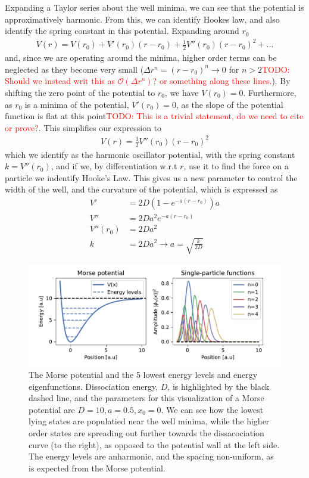 \documentclass{subfiles}
\begin{document}
Expanding a Taylor series about the well minima, we can see that the potential is approximatively harmonic. From this, we can identify Hookes law, and also identify the spring constant in this potential. Expanding around $r_0$
\begin{align*}
    V(r) = V(r_0) + V'(r_0)(r-r_0) + \frac{1}{2}V''(r_0)(r-r_0)^2 + ...
\end{align*}
and, since we are operating around the minima, higher order terms can be neglected as they become very small ($\Delta r^n = (r - r_0)^n\to 0$ for $n>2$\textcolor{red}{TODO: Should we instead writ this as $\mathcal{O}(\Delta r^n)$? or something along these lines.}). By shifting the zero point of the potential to $r_0$, we have $V(r_0) = 0$. Furthermore, as $r_0$ is a minima of the potential, $V'(r_0) = 0$, as the slope of the potential function is flat at this point\textcolor{red}{TODO: This is a trivial statement, do we need to cite or prove?}. This simplifies our expression to
\begin{align*}
    V(r) = \frac{1}{2}V''(r_0)(r-r_0)^2
\end{align*}
which we identify as the harmonic oscillator potential, with the spring constant $k = V''(r_0)$, and if we, by differentiation w.r.t $r$, use it to find the force on a particle we indentify Hooke's Law. This gives us a new parameter to control the width of the well, and the curvature of the potential, which is expressed as
\begin{align*}
    V' &= 2D(1 - e^{-a(r-r_0)})a \\
    V'' &= 2Da^2e^{-a(r-r_0)} \\
    V''(r_0) &= 2Da^2 \\
    k &= 2Da^2 \rightarrow a = \sqrt{\frac{k}{2D}}
\end{align*} 
\begin{figure}[h!]
    \centering
    \includegraphics[width=1.0\textwidth]{figs/potential_spf.pdf}
    \caption{The Morse potential and the 5 lowest energy levels and energy eigenfunctions. Dissociation energy, $D$, is highlighted by the black dashed line, and the parameters for this visualization of a Morse potential are $D=10, a=0.5, x_0=0$. We can see how the lowest lying states are populatied near the well minima, while the higher order states are spreading out further towards the dissacociation curve (to the right), as opposed to the potential wall at the left side. The energy levels are anharmonic, and the spacing non-uniform, as is expected from the Morse potential. }
    \label{fig:morse_potential}
\end{figure}
\end{document}
